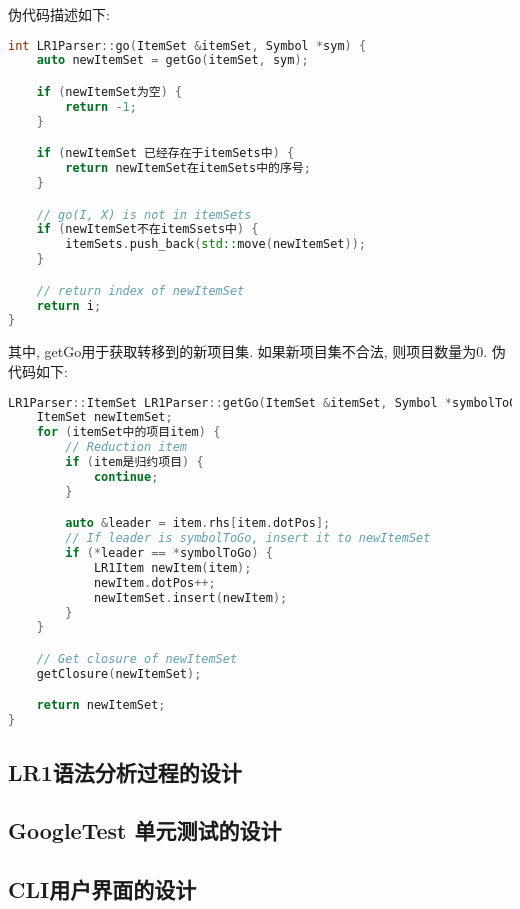 伪代码描述如下:
\begin{lstlisting}[language=c++]
int LR1Parser::go(ItemSet &itemSet, Symbol *sym) {
    auto newItemSet = getGo(itemSet, sym);

    if (newItemSet为空) {
        return -1;
    }

    if (newItemSet 已经存在于itemSets中) {
        return newItemSet在itemSets中的序号;
    }

    // go(I, X) is not in itemSets
    if (newItemSet不在itemSsets中) {
        itemSets.push_back(std::move(newItemSet));
    }

    // return index of newItemSet
    return i;
}
\end{lstlisting}

其中, getGo用于获取转移到的新项目集. 如果新项目集不合法, 则项目数量为0.
伪代码如下:
\begin{lstlisting}[language=c++]
LR1Parser::ItemSet LR1Parser::getGo(ItemSet &itemSet, Symbol *symbolToGo) {
    ItemSet newItemSet;
    for (itemSet中的项目item) {
        // Reduction item
        if (item是归约项目) {
            continue;
        }

        auto &leader = item.rhs[item.dotPos];
        // If leader is symbolToGo, insert it to newItemSet
        if (*leader == *symbolToGo) {
            LR1Item newItem(item);
            newItem.dotPos++;
            newItemSet.insert(newItem);
        }
    }

    // Get closure of newItemSet
    getClosure(newItemSet);

    return newItemSet;
}
\end{lstlisting}

\subsection{LR1语法分析过程的设计}

\subsection{GoogleTest 单元测试的设计}
\subsection{CLI用户界面的设计}
